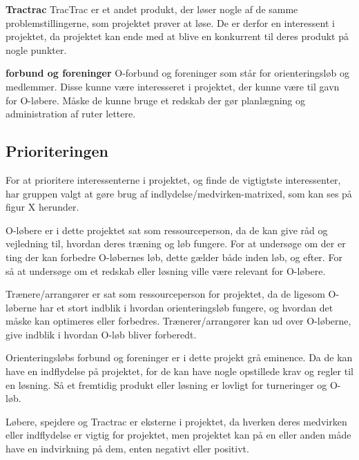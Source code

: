\textbf{Tractrac}\newline
TracTrac er et andet produkt, der løser nogle af de samme problemstillingerne, som projektet prøver at løse. De er derfor en interessent i projektet, da projektet kan ende med at blive en konkurrent til deres produkt på nogle punkter. 

\textbf{forbund og foreninger} \newline
O-forbund og foreninger som står for orienteringsløb og medlemmer. Disse kunne være interesseret i projektet, der kunne være til gavn for O-løbere. Måske de kunne bruge et redskab der gør planlægning og administration af ruter lettere.


\subsection{Prioriteringen}
For at prioritere interessenterne i projektet, og finde de vigtigtste interessenter, har gruppen valgt at gøre brug af indlydelse/medvirken-matrixed, som kan ses på figur X herunder.

O-løbere er i dette projektet sat som ressourceperson, da de kan give råd og vejledning til, hvordan deres træning og løb fungere. For at undersøge om der er ting der kan forbedre O-løbernes løb, dette gælder både inden løb, og efter. For så at undersøge om et redskab eller løsning ville være relevant for O-løbere.

Trænere/arrangører er sat som ressourceperson for projektet, da de ligesom O-løberne har et stort indblik i hvordan orienteringsløb fungere, og hvordan det måske kan optimeres eller forbedres. Trænerer/arrangører kan ud over O-løberne, give indblik i hvordan O-løb bliver forberedt.

Orienteringsløbs forbund og foreninger er i dette projekt grå eminence. Da de kan have en indflydelse på projektet, for de kan have nogle opstillede krav og regler til en løsning. Så et fremtidig produkt eller løsning er lovligt for turneringer og O-løb. 

Løbere, spejdere og Tractrac er eksterne i projektet, da hverken deres medvirken eller indflydelse er vigtig for projektet, men projektet kan på en eller anden måde have en indvirkning på dem, enten negativt eller positivt.

